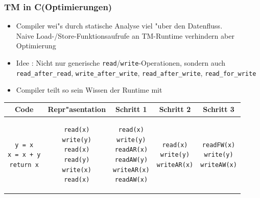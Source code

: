 \documentclass[t]{beamer}
\newcommand{\Rplus}{\protect\raisebox{.1ex}{+}}
\newcommand{\Cpp}{\mbox{C\Rplus\Rplus}\xspace}
\begin{document}
\begin{frame}[fragile]
  \frametitle{TM in \Cpp (Optimierungen)}

  \begin{itemize}
  \item Compiler wei"s durch statische Analyse viel "uber den Datenfluss. \\
        Naive Load-/Store-Funktionsaufrufe an TM-Runtime verhindern aber Optimierung
  \item Idee \cite{DesignAndImplTMC++}: Nicht nur generische
        \lstinline|read|/\lstinline|write|-Operationen,
        sondern auch \lstinline|read_after_read|, \lstinline|write_after_write|,
        \lstinline|read_after_write|, \lstinline|read_for_write|
  \item Compiler teilt so sein Wissen der Runtime mit
  \end{itemize}

  \begin{center}
  \begin{tabular}{| c | c | c | c | c |} \hline
  Code & Repr"asentation & Schritt 1 & Schritt 2 & Schritt 3 \\ \hline

\begin{lstlisting}
y = x
x = x + y
return x
\end{lstlisting}

  &

\begin{lstlisting}
read(x)
write(y)
read(x)
read(y)
write(x)
read(x)
\end{lstlisting}

  &

\begin{lstlisting}
read(x)
write(y)
readAR(x)
readAW(y)
writeAR(x)
readAW(x)
\end{lstlisting}

  &

\begin{lstlisting}
read(x)
write(y)
writeAR(x)
\end{lstlisting}

  &

\begin{lstlisting}
readFW(x)
write(y)
writeAW(x)
\end{lstlisting}

  \\
  \hline
  \end{tabular}
  \end{center}
\end{frame}
\end{document}
